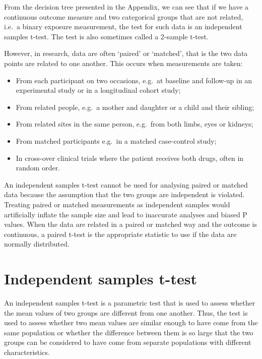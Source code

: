 \documentclass[
]{memoir}
\providecommand{\tightlist}{%
  \setlength{\itemsep}{0pt}\setlength{\parskip}{0pt}}
\begin{document}
From the decision tree presented in the Appendix, we can see that if we have a continuous outcome measure and two categorical groups that are not related, i.e.~a binary exposure measurement, the test for such data is an independent samples t-test. The test is also sometimes called a 2-sample t-test.

However, in research, data are often `paired' or `matched', that is the two data points are related to one another. This occurs when measurements are taken:

\begin{itemize}
\tightlist
\item
  From each participant on two occasions, e.g.~at baseline and follow-up in an experimental study or in a longitudinal cohort study;
\item
  From related people, e.g.~a mother and daughter or a child and their sibling;
\item
  From related sites in the same person, e.g.~from both limbs, eyes or kidneys;
\item
  From matched participants e.g.~in a matched case-control study;
\item
  In cross-over clinical trials where the patient receives both drugs, often in random order.
\end{itemize}

An independent samples t-test cannot be used for analysing paired or matched data because the assumption that the two groups are independent is violated. Treating paired or matched measurements as independent samples would artificially inflate the sample size and lead to inaccurate analyses and biased P values. When the data are related in a paired or matched way and the outcome is continuous, a paired t-test is the appropriate statistic to use if the data are normally distributed.

\hypertarget{independent-samples-t-test}{%
\section{Independent samples t-test}\label{independent-samples-t-test}}

An independent samples t-test is a parametric test that is used to assess whether the mean values of two groups are different from one another. Thus, the test is used to assess whether two mean values are similar enough to have come from the same population or whether the difference between them is so large that the two groups can be considered to have come from separate populations with different characteristics.
\end{document}
